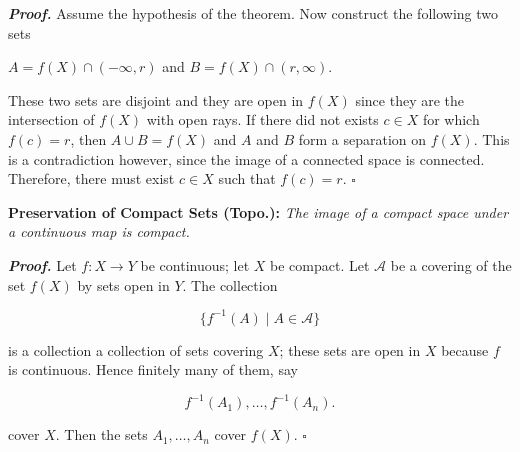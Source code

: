 \documentclass[12pt, a4paper]{article}
\begin{document}
\begin{description}
    \item\textit{\textbf{Proof.}} Assume the hypothesis of the theorem. Now construct the following two sets 
    
    \vspace{2mm}
    
    \centerline{$A=f(X)\cap(-\infty,r)$ \hspace{2mm}and\hspace{2mm} $B=f(X)\cap(r,\infty)$.}
    
    \vspace{2mm}
    
    These two sets are disjoint and they are open in $f(X)$ since they are the intersection of $f(X)$ with open rays. If there did not exists $c\in X$ for which $f(c)=r$, then $A\cup B=f(X)$ and $A$ and $B$ form a separation on $f(X)$. This is a contradiction however, since the image of a connected space is connected. Therefore, there must exist $c\in X$ such that $f(c)=r$. $\square$
\end{description}

\newpage

\textbf{Preservation of Compact Sets (Topo.): } \textit{The image of a compact space under a continuous map is compact.}

\begin{description}
    \item\textit{\textbf{Proof.}} Let $f\colon X\rightarrow Y$ be continuous; let $X$ be compact. Let $\mathcal{A}$ be a covering of the set $f(X)$ by sets open in $Y$. The collection
    
    \begin{equation*}
        \{f^{-1}(A)\mid A\in\mathcal{A}\}
    \end{equation*}
    
    is a collection a collection of sets covering $X$; these sets are open in $X$ because $f$ is continuous. Hence finitely many of them, say
    
    \begin{equation*}
        f^{-1}(A_1), \dots, f^{-1}(A_n).
    \end{equation*}
    
    cover $X$. Then the sets $A_1,\dots,A_n$ cover $f(X)$. $\square$
\end{description}

\vspace{4mm}\par
\end{document}
